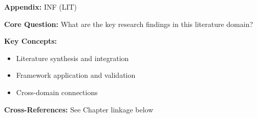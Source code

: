 
\begin{tcolorbox}[colback=blue!5!white, colframe=blue!75!black,
    title=Quick Reference: Appendix UNMAPPED_INF]
\textbf{Appendix:} INF (LIT)

\textbf{Core Question:} What are the key research findings in this literature domain?

\textbf{Key Concepts:}
\begin{itemize}[nosep]
\item Literature synthesis and integration
\item Framework application and validation
\item Cross-domain connections
\end{itemize}

\textbf{Cross-References:} See Chapter linkage below
\end{tcolorbox}


\begin{abstract}
This appendix provides a systematic review and integration of key research findings
in the LIT domain. It synthesizes literature relevant to the Evidence-Based
Framework (EBF) and identifies connections to the 10C CORE architecture.
\end{abstract}


